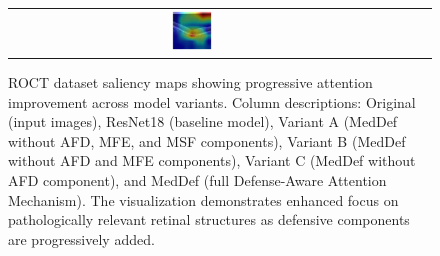 \documentclass[preprint,12pt]{elsarticle}
\begin{document}
\begin{figure}[!t]
\begin{tabular}{c c c c c c c}
          & \includegraphics[width=0.12\textwidth]{fig/saliency_map/roct/roct_meddef12.png} \\
    \end{tabular}
    \caption{ROCT dataset saliency maps showing progressive attention improvement across model variants. Column descriptions: Original (input images), ResNet18 (baseline model), Variant A (MedDef without AFD, MFE, and MSF components), Variant B (MedDef without AFD and MFE components), Variant C (MedDef without AFD component), and MedDef (full Defense-Aware Attention Mechanism). The visualization demonstrates enhanced focus on pathologically relevant retinal structures as defensive components are progressively added.}
    \label{fig:roct_saliency}
\end{figure}
\end{document}
